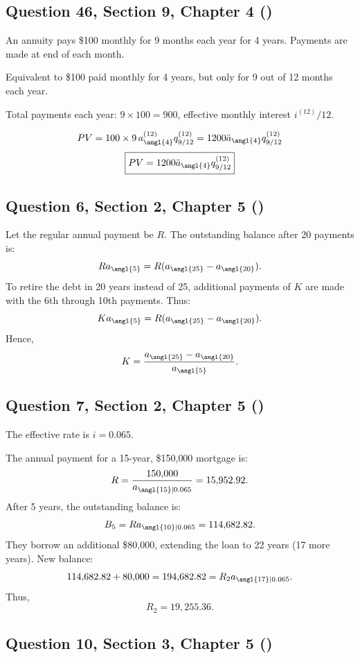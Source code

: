 \documentclass[12pt, a4paper]{article}
\begin{document}
\subsection*{Question 46, Section 9, Chapter 4  (\cite{toi3rd})}

An annuity pays \$100 monthly for 9 months each year for 4 years.  
Payments are made at end of each month.

Equivalent to \$100 paid monthly for 4 years, but only for 9 out of 12 months each year.

Total payments each year: \( 9 \times 100 = 900 \),  
effective monthly interest \( i^{(12)}/12 \).

\[
PV = 100 \times 9 \, a_{\angl{4}}^{(12)} q_{9/12}^{(12)} = 1200 \ddot{a}_{\angl{4}} q_{9/12}^{(12)}
\]
\[
\boxed{PV = 1200 \ddot{a}_{\angl{4}} q_{9/12}^{(12)}}
\]

\subsection*{Question 6, Section 2, Chapter 5  (\cite{toi3rd})}

Let the regular annual payment be \( R \).  
The outstanding balance after 20 payments is:
\[
R a_{\angl{5}} = R(a_{\angl{25}} - a_{\angl{20}}).
\]
To retire the debt in 20 years instead of 25, additional payments of \( K \) are made with the 6th through 10th payments.  
Thus:
\[
K a_{\angl{5}} = R(a_{\angl{25}} - a_{\angl{20}}).
\]
Hence,
\[
K = \frac{a_{\angl{25}} - a_{\angl{20}}}{a_{\angl{5}}}.
\]

\subsection*{Question 7, Section 2, Chapter 5  (\cite{toi3rd})}

The effective rate is \( i = 0.065 \).

The annual payment for a 15-year, \$150{,}000 mortgage is:
\[
R = \frac{150{,}000}{a_{\angl{15}|0.065}} = 15{,}952.92.
\]
After 5 years, the outstanding balance is:
\[
B_5 = R a_{\angl{10}|0.065} = 114{,}682.82.
\]
They borrow an additional \$80{,}000, extending the loan to 22 years (17 more years).  
New balance:
\[
114{,}682.82 + 80{,}000 = 194{,}682.82 = R_2 a_{\angl{17}|0.065}.
\]
Thus,
\[
R_2 = 19{,}255.36.
\]

\subsection*{Question 10, Section 3, Chapter 5  (\cite{toi3rd})}
\end{document}
